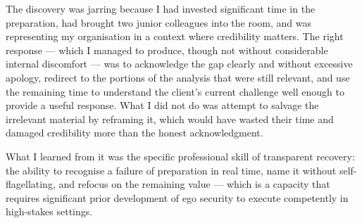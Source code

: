 \begin{ieltsanswer}
The discovery was jarring because I had invested significant time in the preparation, had brought two junior colleagues into the room, and was representing my organisation in a context where credibility matters. The right response — which I managed to produce, though not without considerable internal discomfort — was to acknowledge the gap clearly and without excessive apology, redirect to the portions of the analysis that were still relevant, and use the remaining time to understand the client's current challenge well enough to provide a useful response. What I did not do was attempt to salvage the irrelevant material by reframing it, which would have wasted their time and damaged credibility more than the honest acknowledgment.

What I learned from it was the specific professional skill of transparent recovery: the ability to recognise a failure of preparation in real time, name it without self-flagellating, and refocus on the remaining value — which is a capacity that requires significant prior development of ego security to execute competently in high-stakes settings.
\end{ieltsanswer}


